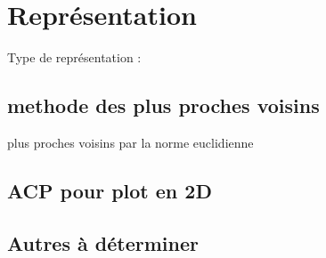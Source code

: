 \documentclass[a4paper]{article}
\begin{document}
\section{Représentation}
Type de représentation :
\subsection{methode des plus proches voisins}
plus proches voisins par la norme euclidienne


\subsection{ACP pour plot en 2D}


\subsection{Autres à déterminer}

\end{document}
